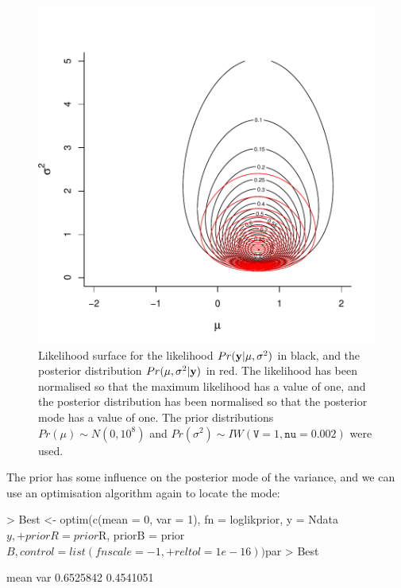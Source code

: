 \documentclass{article}
\begin{document}
\begin{figure}[!h]
\begin{center}
\includegraphics{Lecture1-034}
\end{center}
\caption{Likelihood surface for the likelihood $Pr({\bf y}|\mu, \sigma^{2})$ in black, and the posterior distribution $Pr(\mu, \sigma^{2} | {\bf y})$ in red.  The likelihood has been normalised so that the maximum likelihood has a value of one, and the posterior distribution has been normalised so that the posterior mode has a value of one. The prior distributions  $Pr(\mu)\sim N(0, 10^8)$ and  $Pr(\sigma^{2})\sim IW(\texttt{V}=1, \texttt{nu}=0.002)$ were used.}
\label{Psurface-fig}
\end{figure}


The prior has some influence on the posterior mode of the variance, and we can use an optimisation algorithm again to locate the mode:  

\begin{Schunk}
\begin{Sinput}
> Best <- optim(c(mean = 0, var = 1), fn = loglikprior, y = Ndata$y, 
+     priorR = prior$R, priorB = prior$B, control = list(fnscale = -1, 
+         reltol = 1e-16))$par
> Best
\end{Sinput}
\begin{Soutput}
     mean       var 
0.6525842 0.4541051 
\end{Soutput}
\end{Schunk}
\end{document}
